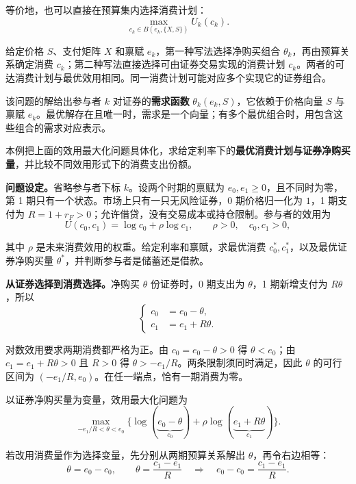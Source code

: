等价地，也可以直接在预算集内选择消费计划：
\[
    \max_{c_k\in B(e_k,\{X,S\})} U_k(c_k).
\]

给定价格 $S$、支付矩阵 $X$ 和禀赋 $e_k$，第一种写法选择净购买组合 $\theta_k$，再由预算关系确定消费 $c_k$；第二种写法直接选择可由证券交易实现的消费计划 $c_k$。两者的可达消费计划与最优效用相同。同一消费计划可能对应多个实现它的证券组合。

    该问题的解给出参与者 $k$ 对证券的\textbf{需求函数} $\theta_k(e_k,S)$，它依赖于价格向量 $S$ 与禀赋 $e_k$。最优解存在且唯一时，需求是一个向量；有多个最优组合时，用包含这些组合的需求对应表示。

\begin{tcolorbox}[example,title=补充算例：两期消费与储蓄]
\begin{question}
本例把上面的效用最大化问题具体化，求给定利率下的\textbf{最优消费计划与证券净购买量}，并比较不同效用形式下的消费支出份额。

\textbf{问题设定。}省略参与者下标 $k$。设两个时期的禀赋为 $e_0,e_1\ge0$，且不同时为零，第 1 期只有一个状态。市场上只有一只无风险证券，0 期价格归一化为 $1$，1 期支付为 $R=1+r_F>0$；允许借贷，没有交易成本或持仓限制。参与者的效用为
\[
 U(c_0,c_1)=\log c_0+\rho\log c_1,
 \qquad \rho>0,\quad c_0,c_1>0,
\]

其中 $\rho$ 是未来消费效用的权重。给定利率和禀赋，求最优消费 $c_0^*,c_1^*$，以及最优证券净购买量 $\theta^*$，并判断参与者是储蓄还是借款。
\end{question}
\begin{solution}[blank-type=manual,blank-vsep=5\baselineskip]
\textbf{从证券选择到消费选择。}净购买 $\theta$ 份证券时，0 期支出为 $\theta$，1 期新增支付为 $R\theta$，所以
\[
 \left\{\begin{aligned}
 c_0&=e_0-\theta,\\
 c_1&=e_1+R\theta.
 \end{aligned}\right.
\]

对数效用要求两期消费都严格为正。由 $c_0=e_0-\theta>0$ 得 $\theta<e_0$；由 $c_1=e_1+R\theta>0$ 且 $R>0$ 得 $\theta>-e_1/R$。两条限制须同时满足，因此 $\theta$ 的可行区间为 $(-e_1/R,e_0)$。在任一端点，恰有一期消费为零。

以证券净购买量为变量，效用最大化问题为
\[
 \max_{-e_1/R<\theta<e_0}
 \bigl\{\log(\underbrace{e_0-\theta}_{c_0})+\rho\log(\underbrace{e_1+R\theta}_{c_1})\bigr\}.
\]

若改用消费量作为选择变量，先分别从两期预算关系解出 $\theta$，再令右边相等：
\[
 \theta=e_0-c_0,\qquad \theta=\frac{c_1-e_1}{R}
 \quad\Longrightarrow\quad
 e_0-c_0=\frac{c_1-e_1}{R}.
\]


\end{solution}
\end{tcolorbox}
